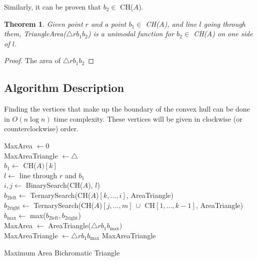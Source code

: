 \documentclass[a4paper]{article}
\newtheorem{theorem}{Theorem}
\begin{document}
    Similarly, it can be proven that $b_2 \in$ CH($A$).

    \vspace{0.5cm}
    \begin{theorem}
        Given point $r$ and a point $b_1 \in$ CH($A$), and line $l$ going through them, 
        TriangleArea($\triangle rb_1b_2$) is a unimodal function for $b_2 \in$ CH($A$) on one side of $l$.
    \end{theorem}

    \begin{proof}
        The area of $\triangle rb_1b_2$
    \end{proof}

    \subsection*{Algorithm Description}
    Finding the vertices that make up the boundary of the convex hull can be done in $O(n\log n)$ time complexity. 
    These vertices will be given in clockwise (or counterclockwise) order. 

    \begin{algorithm}[H]
    
        MaxArea $\gets 0$ \\
        MaxAreaTriangle $\gets \triangle$ \\
        {
            $b_1 \gets$ CH($A)[k]$ \\
            $l \gets$ line through $r$ and $b_1$ \\
            $i, j \gets$ BinarySearch(CH($A$), $l$) \\
            $b_{2\text{left}} \gets$ TernarySearch(CH($A$)$[k,...,i]$, AreaTriangle) \\
            $b_{2\text{right}} \gets$ TernarySearch(CH($A$)$[j,...,m]\ \cup$ CH$[1,...,k-1]$, AreaTriangle) \\
            $b_{\text{max}} \gets$ max($b_{2\text{left}}, b_{2\text{right}}$) \\
            {
                MaxArea $\gets$ AreaTriangle($\triangle rb_1b_{\text{max}})$ \\ 
                MaxAreaTriangle $\gets \triangle rb_1b_{\text{max}}$ 
            }
        }
        \Return MaxAreaTriangle
        \caption{Maximum Area Bichromatic Triangle}
    \end{algorithm}
\end{document}
